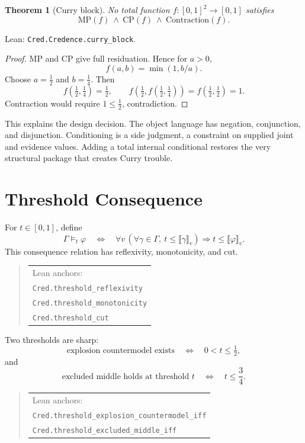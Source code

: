 \documentclass[11pt,a4paper]{article}
\newtheorem{theorem}{Theorem}[section]
\newcommand{\half}{\tfrac12}
\newcommand{\quarter}{\tfrac14}
\newcommand{\val}[1]{\llbracket #1 \rrbracket}
\newcommand{\Lean}[1]{\texttt{#1}}
\begin{document}
\begin{theorem}[Curry block]
\label{thm:curry-block}
No total function $f:[0,1]^2\to[0,1]$ satisfies
\[
  \mathrm{MP}(f)\ \wedge\ \mathrm{CP}(f)\ \wedge\
  \mathrm{Contraction}(f).
\]
\end{theorem}

\noindent
Lean: \Lean{Cred.Credence.curry\_block}.

\begin{proof}
MP and CP give full residuation.  Hence for $a>0$,
\[
  f(a,b)=\min(1,b/a).
\]
Choose $a=\half$ and $b=\quarter$.  Then
\[
  f(\half,\quarter)=\half,\qquad
  f(\half,f(\half,\quarter))=f(\half,\half)=1.
\]
Contraction would require $1\le\half$, contradiction.
\end{proof}

This explains the design decision.  The object language has negation,
conjunction, and disjunction.  Conditioning is a side judgment, a
constraint on supplied joint and evidence values.  Adding a total
internal conditional restores the very structural package that creates
Curry trouble.

\section{Threshold Consequence}

For $t\in[0,1]$, define
\[
  \Gamma\models_t\varphi
  \quad\Longleftrightarrow\quad
  \forall v\,
  \left(
  \forall\gamma\in\Gamma,\ t\le\val{\gamma}_v
  \right)
  \Rightarrow
  t\le\val{\varphi}_v.
\]
This consequence relation has reflexivity, monotonicity, and cut.
\begin{quote}\scriptsize
\begin{tabular}{@{}l@{}}
Lean anchors: \\
\Lean{Cred.threshold\_reflexivity}\\
\Lean{Cred.threshold\_monotonicity}\\
\Lean{Cred.threshold\_cut}
\end{tabular}
\end{quote}

Two thresholds are sharp:
\[
\text{explosion countermodel exists}
\quad\Longleftrightarrow\quad
0<t\le\half,
\]
and
\[
\text{excluded middle holds at threshold }t
\quad\Longleftrightarrow\quad
t\le\frac34.
\]
\begin{quote}\scriptsize
\begin{tabular}{@{}l@{}}
Lean anchors: \\
\Lean{Cred.threshold\_explosion\_countermodel\_iff}\\
\Lean{Cred.threshold\_excluded\_middle\_iff}
\end{tabular}
\end{quote}
\end{document}
